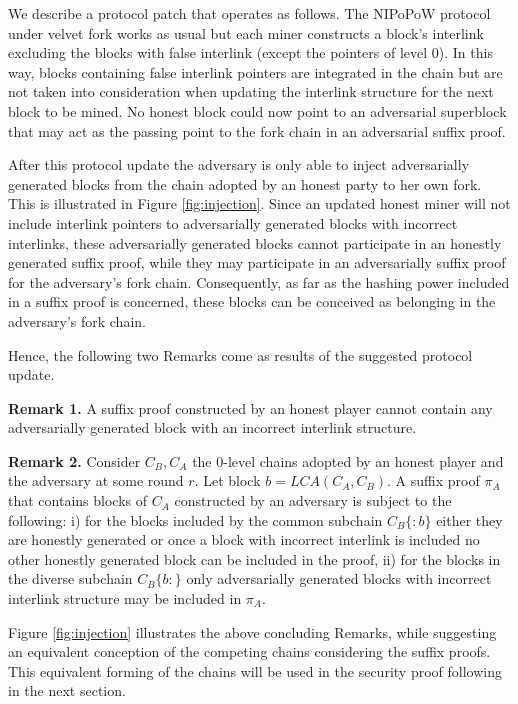 \documentclass[9pt,a4paper]{article}
\begin{document}
We describe a protocol patch that operates as follows. The NIPoPoW protocol under velvet fork works as usual but each miner constructs a block's interlink excluding the blocks with false interlink (except the pointers of level 0). In this way, blocks containing false interlink pointers are integrated in the chain but are not taken into consideration when updating the interlink structure for the next block to be mined. No honest block could now point to an adversarial superblock that may act as the passing point to the fork chain in an adversarial suffix proof. 

After this protocol update the adversary is only able to inject adversarially generated blocks from the chain adopted by an honest party to her own fork. This is illustrated in Figure \ref{fig:injection}.
Since an updated honest miner will not include interlink pointers to adversarially generated blocks with incorrect interlinks, these adversarially generated blocks cannot participate in an honestly generated suffix proof, while they may participate in an adversarially suffix proof for the adversary's fork chain. Consequently, as far as the hashing power included in a suffix proof is concerned, these blocks can be conceived as belonging in the adversary's fork chain. 

Hence, the following two Remarks come as results of the suggested protocol update.

\textbf{Remark 1.} A suffix proof constructed by an honest player cannot contain any adversarially generated block with an incorrect interlink structure.

\textbf{Remark 2.} Consider $C_B, C_A$ the 0-level chains adopted by an honest player and the adversary at some round $r$. Let block $b = LCA(C_A, C_B)$. A suffix proof $\pi_A$ that contains blocks of $C_A$ constructed by an adversary is subject to the following: i) for the blocks included by the common subchain $C_B\{:b\}$ either they are honestly generated or once a block with incorrect interlink is included no other honestly generated block can be included in the proof, ii) for the blocks in the diverse subchain $C_B\{b:\}$ only adversarially generated blocks with incorrect interlink structure may be included in $\pi_A$.

Figure \ref{fig:injection} illustrates the above concluding Remarks, while suggesting an equivalent conception of the competing chains considering the suffix proofs. This equivalent forming of the chains will be used in the security proof following in the next section. 
\end{document}
